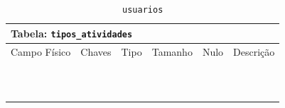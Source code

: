 \documentclass[12pt,a4paper]{article}
\begin{document}
\begin{center}
\begin{table}[h!]
	\caption{\texttt{usuarios}}
	\label{tabela:usuarios}
	\begin{tabular}{|p{2.5cm}|p{1cm}|p{1.25cm}|p{1.75cm}|p{1.25cm}|p{5cm}|}\hline	
		\multicolumn{6}{|p{16cm}|}{\cellcolor{cinzaClaro}  \centering Tabela: \texttt{tipos\_atividades}} \\ \hline %
		{\small Campo Físico}   & {\small Chaves} & {\small Tipo} & {\small Tamanho} & {\small Nulo} & {\small Descrição}\\\hline %
		
		{\tiny } & {\tiny } & {\tiny } & {\tiny } & {\tiny } &{\tiny }\\\hline
		{\tiny } & {\tiny } & {\tiny } & {\tiny } & {\tiny } &{\tiny }\\\hline
		{\tiny } & {\tiny } & {\tiny } & {\tiny } & {\tiny } &{\tiny }\\\hline
		{\tiny } & {\tiny } & {\tiny } & {\tiny } & {\tiny } &{\tiny }\\\hline
		{\tiny } & {\tiny } & {\tiny } & {\tiny } & {\tiny } &{\tiny }\\\hline
		{\tiny } & {\tiny } & {\tiny } & {\tiny } & {\tiny } &{\tiny }\\\hline
		{\tiny } & {\tiny } & {\tiny } & {\tiny } & {\tiny } &{\tiny }\\\hline
		{\tiny } & {\tiny } & {\tiny } & {\tiny } & {\tiny } &{\tiny }\\\hline
		{\tiny } & {\tiny } & {\tiny } & {\tiny } & {\tiny } &{\tiny }\\\hline		
		{\tiny } & {\tiny } & {\tiny } & {\tiny } & {\tiny } &{\tiny }\\\hline
		{\tiny } & {\tiny } & {\tiny } & {\tiny } & {\tiny } &{\tiny }\\\hline
		
			
	\end{tabular}
\end{table}	
\end{center}
\end{document}
